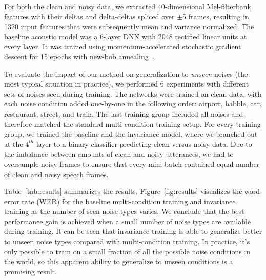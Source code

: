 \documentclass[a4paper]{article}
\begin{document}
For both the clean and noisy data, we extracted 40-dimensional Mel-filterbank features with their deltas and 
delta-deltas spliced over $\pm$5 frames, resulting in 1320 input 
features that were subsequently mean and variance normalized. The baseline
acoustic model was a 6-layer 
DNN with 2048 rectified linear units at every layer. It was trained using 
momentum-accelerated stochastic gradient descent for 15 epochs with new-bob 
annealing~\cite[the learning rate is halved if no improvement on the validation set, as in][]{morgan1995continuous,sainath2011making}.

To evaluate the impact of our method on generalization to \emph{unseen} noises (the
most typical situation in practice),
we performed 6 experiments with different sets of noises seen during training.
The networks were trained
on clean data, with each noise condition added one-by-one in the following order: airport, babble, car, 
restaurant, street, and train. The last training group included all noises and therefore matched the
standard multi-condition training setup. For every training group, we trained the
baseline and the invariance model, where we branched out at the $4^{th}$ layer to a
binary classifier predicting clean versus noisy data. Due to the imbalance between amounts of clean and
noisy utterances, we had to oversample noisy frames to ensure that every mini-batch contained
equal number of clean and noisy speech frames.

Table~\ref{tab:results} summarizes the results. Figure~\ref{fig:results} visualizes 
the word error rate (WER) for the baseline multi-condition training and invariance training 
as the number of seen noise types varies. We conclude that the best performance
gain is achieved when a small number of noise types are available during training. 
It can be seen that invariance training is able to generalize better to unseen 
noise types compared with multi-condition training.
In practice, it's only possible to train on a small fraction of all the possible
noise conditions in the world, so this apparent ability to generalize to unseen
conditions is a promising result.
\end{document}
